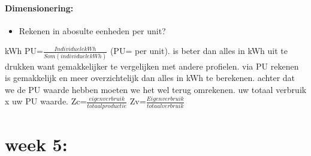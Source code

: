 \documentclass[12pt]{article}
\begin{document}
\paragraph{Dimensionering:}\begin{itemize}
    \item Rekenen in abosulte eenheden per unit?
\end{itemize}
kWh PU=$\frac{Individuele kWh}{Som(individuele kWh)}$ (PU= per unit). is beter dan alles in kWh uit te drukken want gemakkelijker te vergelijken met andere profielen. via PU rekenen is gemakkelijk en meer overzichtelijk dan alles in kWh te berekenen. achter dat we de PU waarde hebben moeten we het wel terug omrekenen. uw totaal verbruik x uw PU waarde.
Zc=$\frac{eigen verbruik}{totaal productie}$ Zv=$\frac{Eigen verbruik}{totaal verbruik}$
\section{week 5:}
\end{document}
